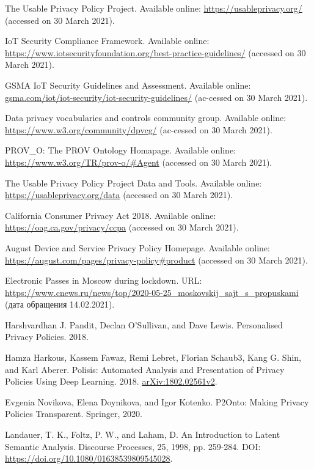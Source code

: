 \documentclass[../main]{subfiles}
\begin{document}
\begin{english}
\begin{biblenum}
     The Usable Privacy Policy Project. Available online: \url{https://usableprivacy.org/} (accessed on 30 March 2021).

     IoT Security Compliance Framework. Available online: \url{https://www.iotsecurityfoundation.org/best-practice-guidelines/} (accessed on 30 March 2021). 

     GSMA IoT Security Guidelines and Assessment. Available online: \url{gsma.com/iot/iot-security/iot-security-guidelines/} (ac-cessed on 30 March 2021). 
    
     Data privacy vocabularies and controls community group. Available online: \url{https://www.w3.org/community/dpvcg/} (ac-cessed on 30 March 2021).

     PROV\_O: The PROV Ontology Homapage. Available online: \url{https://www.w3.org/TR/prov-o/#Agent} (accessed on 30 March 2021). 

     The Usable Privacy Policy Project Data and Tools. Available online: \url{https://usableprivacy.org/data} (accessed on 30 March 2021).

     California Consumer Privacy Act 2018. Available online: \url{https://oag.ca.gov/privacy/ccpa} (accessed on 30 March 2021). 

     August Device and Service Privacy Policy Homepage. Available online: \url{https://august.com/pages/privacy-policy#product} (accessed on 30 March 2021).

     Electronic Passes in Moscow during lockdown. URL: \url{https://www.cnews.ru/news/top/2020-05-25_moskovskij_sajt_s_propuskami} (дата обращения 14.02.2021).

     Harshvardhan J. Pandit, Declan O’Sullivan, and Dave Lewis. Personalised Privacy Policies. 2018.
    
     Hamza Harkous, Kassem Fawaz, Remi Lebret, Florian Schaub3, Kang G. Shin, and Karl Aberer. Polisis: Automated Analysis and Presentation of Privacy Policies Using Deep Learning. 2018. \href{https://arxiv.org/abs/1802.02561v2}{arXiv:1802.02561v2}.

     Evgenia Novikova, Elena Doynikova, and Igor Kotenko. P2Onto: Making Privacy Policies Transparent. Springer, 2020.

     Landauer, T. K., Foltz, P. W., and Laham, D. An Introduction to Latent Semantic Analysis. Discourse Processes, 25, 1998, pp. 259-284. DOI: \url{https://doi.org/10.1080/01638539809545028}.


\end{biblenum}
\end{english}
\end{document}
